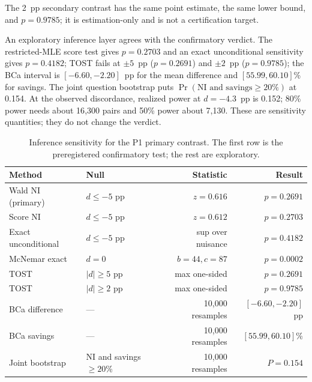 \documentclass[a4paper,fleqn]{cas-sc}
\begin{document}
The 2~pp secondary contrast has the same point estimate, the same lower bound, and $p=0.9785$;
it is estimation-only and is not a certification target.

An exploratory inference layer agrees with the confirmatory verdict. The restricted-MLE score
test gives $p=0.2703$ and an exact unconditional sensitivity gives $p=0.4182$; TOST fails at
$\pm5$~pp ($p=0.2691$) and $\pm2$~pp ($p=0.9785$); the BCa
interval is $[-6.60,-2.20]$~pp for the mean difference and $[55.99,60.10]$\% for savings. The
joint question bootstrap puts $\Pr(\text{NI and savings}\ge20\%)$ at 0.154. At the observed
discordance, realized power at $d=-4.3$~pp is 0.152; 80\% power needs about 16{,}300 pairs and
50\% power about 7{,}130. These are sensitivity quantities; they do not change the verdict.

\begin{table}[pos=htbp]
  \centering
  \caption{Inference sensitivity for the P1 primary contrast. The first row is the preregistered confirmatory test; the rest are exploratory.}
  \label{tab:p1inference}
  \footnotesize
  \begin{tabular}{@{}llrr@{}}
    \toprule
    \textbf{Method} & \textbf{Null} & \textbf{Statistic} & \textbf{Result} \\
    \midrule
    Wald NI (primary) & $d\le-5$ pp & $z=0.616$ & $p=0.2691$ \\
    Score NI & $d\le-5$ pp & $z=0.612$ & $p=0.2703$ \\
    Exact unconditional & $d\le-5$ pp & sup over nuisance & $p=0.4182$ \\
    McNemar exact & $d=0$ & $b=44,c=87$ & $p=0.0002$ \\
    TOST & $|d|\ge5$ pp & max one-sided & $p=0.2691$ \\
    TOST & $|d|\ge2$ pp & max one-sided & $p=0.9785$ \\
    BCa difference & --- & 10{,}000 resamples & $[-6.60,-2.20]$ pp \\
    BCa savings & --- & 10{,}000 resamples & $[55.99,60.10]$\% \\
    Joint bootstrap & NI and savings $\ge20$\% & 10{,}000 resamples & $P=0.154$ \\
    \bottomrule
  \end{tabular}
\end{table}
\end{document}
